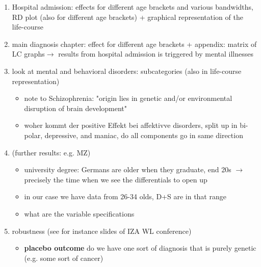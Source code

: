 \documentclass[11pt, a4paper]{article} %
\begin{document}
\begin{enumerate}
	\item Hospital admission: effects for different age brackets and various bandwidths, RD plot (also for different age brackets) + graphical representation of the life-course
	\item main diagnosis chapter: effect for different age brackets + appendix: matrix of LC graphs\newline $\rightarrow$ results from hospital admission is triggered by mental illnesses
	\item look at mental and behavioral disorders: subcategories (also in life-course representation) 
	\begin{itemize}
		\item 	note to Schizophrenia: "origin lies in genetic and/or environmental disruption of brain development" \citep{owen2016schizophrenia}
		\item woher kommt der positive Effekt bei affektivve disorders, split up in bi-polar, depressive, and maniac, do all components go in same direction
	\end{itemize}
	\item (further results: e.g. MZ)
	\begin{itemize}
		\item university degree: Germans are older when they graduate, end 20s $\rightarrow$ precisely the time when we see the differentials to open up
		\item in our case we have data from 26-34 olds, D+S are in that range
		\item what are the variable specifications
	\end{itemize}
	\item robustness (see for instance slides of IZA WL conference)
	\begin{itemize}
		\item \textbf{placebo outcome} do we have one sort of diagnosis that is purely genetic (e.g. some sort of cancer)
	\end{itemize}
\end{enumerate}












\end{document}
